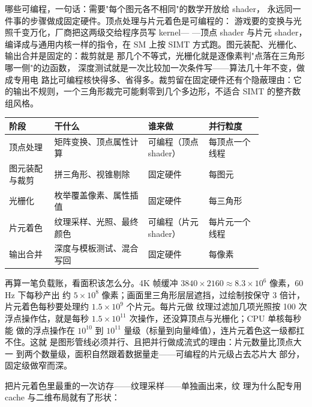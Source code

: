 哪些可编程，一句话：需要"每个图元各不相同"的数学开放给 shader，
永远同一件事的步骤做成固定硬件。顶点处理与片元着色是可编程的：
游戏要的变换与光照千变万化，厂商把这两级交给程序员写 kernel—
—顶点 shader 与片元 shader，编译成与通用内核一样的指令，在 SM
上按 SIMT 方式跑。图元装配、光栅化、输出合并是固定的：裁剪就是
那几个不等式，光栅化就是逐像素判"点落在三角形哪一侧"的边函数，
深度测试就是一次比较加一次条件写——算法几十年不变，做成专用电
路比可编程核快得多、省得多。裁剪留在固定硬件还有个隐蔽理由：它
的输出不规则，一个三角形裁完可能剩零到几个多边形，不适合 SIMT
的整齐数组风格。

\begin{longtable}{L{0.15\linewidth}L{0.31\linewidth}L{0.20\linewidth}L{0.18\linewidth}}
\toprule
阶段 & 干什么 & 谁来做 & 并行粒度 \\
\midrule
顶点处理 & 矩阵变换、顶点属性计算 & 可编程（顶点 shader） & 每顶点一个线程 \\
图元装配与裁剪 & 拼三角形、视锥剔除 & 固定硬件 & 每图元 \\
光栅化 & 枚举覆盖像素、属性插值 & 固定硬件 & 每三角形 \\
片元着色 & 纹理采样、光照、最终颜色 & 可编程（片元 shader） & 每片元一个线程 \\
输出合并 & 深度与模板测试、混合写回 & 固定硬件 & 每像素 \\
\bottomrule
\end{longtable}

再算一笔负载账，看面积该怎么分。4K 帧缓冲
$3840\times2160\approx8.3\times10^{6}$ 像素，60 Hz 下每秒产出
约 $5\times10^{8}$ 像素；画面里三角形层层遮挡，过绘制按保守 3
倍计，片元着色每秒要处理约 $1.5\times10^{9}$ 个片元。每片元做
纹理过滤加几项光照按 100 次浮点操作估，就是每秒
$1.5\times10^{11}$ 次操作，还没算顶点与光栅化；CPU 单核每秒能
做的浮点操作在 $10^{10}$ 到 $10^{11}$ 量级（标量到向量峰值），连片元着色这一级都扛不住。这就
是图形管线必须并行、且把并行做成流式的理由：片元数量比顶点大一
到两个数量级，面积自然跟着数据量走——可编程的片元级占去芯片大
部分，固定级做窄而深。

把片元着色里最重的一次访存——纹理采样——单独画出来，纹
理为什么配专用 cache 与二维布局就有了形状：

